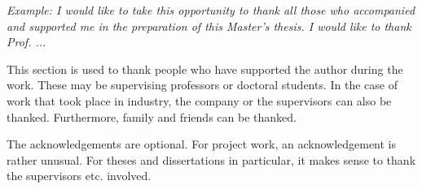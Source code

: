 
\textit{Example: I would like to take this opportunity to thank all those who accompanied and supported me in the preparation of this Master's thesis. I would like to thank Prof. ...} \newline


This section is used to thank people who have supported the author during the work. These may be supervising professors or doctoral students. In the case of work that took place in industry, the company or the supervisors can also be thanked. Furthermore, family and friends can be thanked. 

The acknowledgements are optional. For project work, an acknowledgement is rather unusual. For theses and dissertations in particular, it makes sense to thank the supervisors etc. involved.

